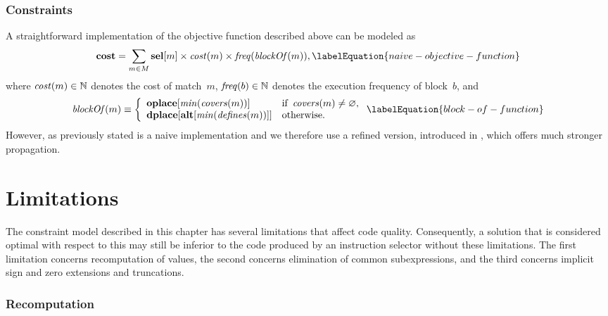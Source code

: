 \subsubsection{Constraints}

A straightforward implementation of the \gls{objective function} described above
can be modeled as
%
\begin{equation}
  \mVar{cost} =
  \sum_{m \in \mMatchSet}
  \mVar{sel}[m] \times \mCost(m) \times \mFreq(\mBlockOf(m)),
  \labelEquation{naive-objective-function}
\end{equation}
%
where \mbox{$\operatorname{\textrm{\textit{cost}}}(m) \in \mathbb{N}$} denotes the cost of \gls{match}~$m$,
\mbox{$\operatorname{\textrm{\textit{freq}}}(b) \in \mathbb{N}$} denotes the execution frequency of
block~$b$\!, and
%
\begin{equation}
  \mBlockOf(m)
  \equiv
  \left\{
  \begin{array}{ll}
      \mVar{oplace}[\mMin(\mCovers(m))]
    & \text{if } \mCovers(m) \neq \mEmptySet, \\
      \mVar{dplace}[\mVar{alt}[\mMin(\mDefines(m))]]
    & \text{otherwise}.
  \end{array}
  \right.
  \labelEquation{block-of-function}
\end{equation}
%
However, as previously stated  is a naive
implementation and we therefore use a refined version, introduced in
, which offers much stronger \gls{propagation}.


\section{Limitations}

The \gls{constraint model} described in this chapter has several limitations
that affect code quality.
%
Consequently, a \gls{solution} that is considered optimal with respect to this
 may still be inferior to the code produced by an
\gls{instruction selector} without these limitations.
%
The first limitation concerns \gls{recomputation} of values, the second concerns
elimination of common subexpressions, and the third concerns implicit sign and
zero extensions and truncations.


\subsubsection{Recomputation}

